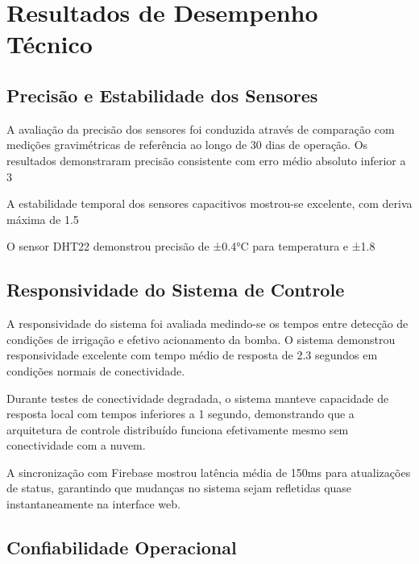 \documentclass[twoside,english,brazilian]{UNISINOSmonografia}
\begin{document}
\section{Resultados de Desempenho Técnico}

\subsection{Precisão e Estabilidade dos Sensores}

A avaliação da precisão dos sensores foi conduzida através de comparação com medições gravimétricas de referência ao longo de 30 dias de operação. Os resultados demonstraram precisão consistente com erro médio absoluto inferior a 3%

A estabilidade temporal dos sensores capacitivos mostrou-se excelente, com deriva máxima de 1.5%

O sensor DHT22 demonstrou precisão de ±0.4°C para temperatura e ±1.8%

\subsection{Responsividade do Sistema de Controle}

A responsividade do sistema foi avaliada medindo-se os tempos entre detecção de condições de irrigação e efetivo acionamento da bomba. O sistema demonstrou responsividade excelente com tempo médio de resposta de 2.3 segundos em condições normais de conectividade.

Durante testes de conectividade degradada, o sistema manteve capacidade de resposta local com tempos inferiores a 1 segundo, demonstrando que a arquitetura de controle distribuído funciona efetivamente mesmo sem conectividade com a nuvem.

A sincronização com Firebase mostrou latência média de 150ms para atualizações de status, garantindo que mudanças no sistema sejam refletidas quase instantaneamente na interface web.

\subsection{Confiabilidade Operacional}
\end{document}
